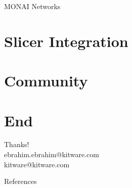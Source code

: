 \documentclass[10pt,aspectratio=169,dvipsnames]{beamer}
\begin{document}
\begin{frame}{MONAI Networks}

\end{frame}


\section{Slicer Integration}


\section{Community}

\section{End}



\begin{frame}[standout]
\centering
{\huge Thanks!}\\
ebrahim.ebrahim@kitware.com\\
kitware@kitware.com\\
\vspace{1cm}
\end{frame}


\begin{frame}[allowframebreaks]{References}
\printbibliography
\end{frame}
\end{document}
